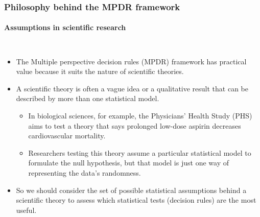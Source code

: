\begin{frame}\frametitle{Philosophy behind the MPDR framework}
	\framesubtitle{Assumptions in scientific research}
	\begin{columns}
\begin{itemize}\itemsep1em
\item The \alert{Multiple perspective decision rules (MPDR) framework} has practical value because it suits the nature of scientific theories.\\

\item A \alert{scientific theory} is often a \alert{vague idea} or a \alert{qualitative result} that can be described by more than one statistical model.
\begin{itemize}
	\item In biological sciences, for example, the Physicians' Health Study (PHS) aims to test a theory that says \alert{prolonged low-dose aspirin} decreases \alert{cardiovascular mortality}.
	\item Researchers testing this theory assume a particular statistical model to formulate the null hypothesis, but that model is \alert{just one way} of representing the data's randomness.
\end{itemize}

\item So we should consider the \alert{set of possible statistical assumptions} behind a scientific theory to assess which statistical tests (decision rules) are the most useful.
\end{itemize}
\end{columns}
\end{frame}





\newcommand{\lw}{0.25}
\newcommand{\rw}{0.65}
\newcommand{\mar}{0.05}
\newcommand{\vs}{\vspace{1.5em}}

\renewcommand{\leftcol}{0.25\linewidth}
\renewcommand{\maincol}{0.65\linewidth}
\renewcommand{\margin}{0.05\linewidth}
\renewcommand{\myspacing}{\vspace{1.5em}}

